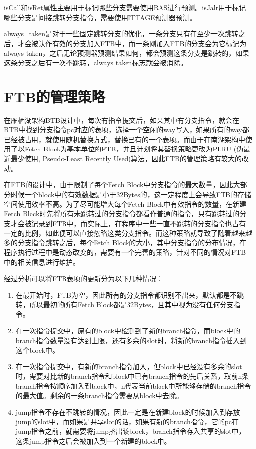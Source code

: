 isCall和isRet属性主要用于标记哪些分支需要使用RAS进行预测。isJalr用于标记哪些分支是间接跳转分支指令，需要使用ITTAGE预测器预测。

always\_taken是对于一些固定跳转分支的优化，一条分支只有在至少一次跳转之后，才会被认作有效的分支加入FTB中，而一条刚加入FTB的分支会为它标记为always taken，之后无论预测器预测结果如何，都会预测这条分支是跳转的，如果这条分支之后有一次不跳转，always taken标志就会被消除。

\section{FTB的管理策略}

在雁栖湖架构BTB设计中，每次有指令提交后，如果其中有分支指令，就会在BTB中找到分支指令pc对应的表项，选择一个空闲的way写入，如果所有的way都已经被占用，就使用随机替换方式，替换已有的一个表项。而由于在南湖架构中使用了以Fetch Block为基本单位的FTB，并且计划将其替换策略更改为PLRU (伪最近最少使用, Pseudo-Least Recently Used)算法，因此FTB的管理策略有较大的改动。

在FTB的设计中，由于限制了每个Fetch Block中分支指令的最大数量，因此大部分时候一个block中的有效数据是小于32Bytes的，这一定程度上会导致FTB的存储空间使用效率不高。为了尽可能增大每个Fetch Block中有效指令的数量，在新建Fetch Block时先将所有未跳转过的分支指令都看作普通的指令，只有跳转过的分支才会被记录到FTB中，而实际上，在程序中一些一直不跳转的分支指令也占有一定的比例，如此便可以直接忽略这类分支指令。而这种策略就导致了随着越来越多的分支指令跳转之后，每个Fetch Block的大小，其中分支指令的分布情况，在程序执行过程中是动态改变的，需要有一个完善的策略，针对不同的情况对FTB中的相关信息进行维护。

经过分析可以将FTB表项的更新分为以下几种情况：

\begin{enumerate}
	\item 在最开始时，FTB为空，因此所有的分支指令都识别不出来，默认都是不跳转，所以最初的所有Fetch Block都是32Bytes，且其中视为没有任何分支指令。
	\item 在一次指令提交中，原有的block中检测到了新的branch指令，而block中的branch指令数量没有达到上限，还有多余的slot时，将新的branch指令插入到这个block中。
	\item 在一次指令提交中，有新的branch指令加入，但block中已经没有多余的slot时，需要对比新的branch指令和block中已有branch指令的先后关系，取前n条branch指令按顺序加入到block中，n代表当前block中所能够存储的branch指令的最大值。剩余的一条branch指令需要从block中去除。
	\item jump指令不存在不跳转的情况，因此一定是在新建block的时候加入到存放jump的slot中，而如果是共享slot的话，如果有新的branch指令，它的pc在jump指令之前，就需要将jump挤出该block，branch指令存入共享的slot中，这条jump指令之后会被加入到一个新建的block中。
\end{enumerate}

